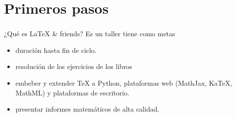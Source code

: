 
\setlength{\parskip}{\baselineskip} 
\section{Primeros pasos}
\begin{frame}[t]
\frametitle{\insertsection}
\begin{block}{¿Qué es \LaTeX{} \& friends?}
	Es un taller tiene como metas
	\begin{itemize}
		\item duración hasta fin de ciclo.
	 	\item resolución de los ejercicios de los libros
	 	\item embeber y extender \TeX{} a Python, plataformas web (MathJax, Ka\TeX, MathML) y plataformas de escritorio.
	 	\item presentar informes matemáticos de alta calidad.
	 \end{itemize} 
\end{block}
\end{frame}

%
%
%



